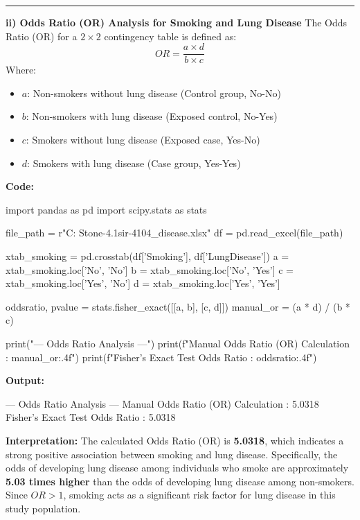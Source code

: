 \documentclass[12pt,a4paper]{article}
\begin{document}
\vspace{0.5cm}
\hrule
\vspace{0.5cm}

\textbf{ii) Odds Ratio (OR) Analysis for Smoking and Lung Disease}
The Odds Ratio (OR) for a $2 \times 2$ contingency table is defined as:
$$OR = \frac{a \times d}{b \times c}$$
Where:
\begin{itemize}
\item $a$: Non-smokers without lung disease 
(Control group, No-No)
\item $b$: Non-smokers with lung disease 
(Exposed control, No-Yes)
\item $c$: Smokers without lung disease 
(Exposed case, Yes-No)
\item $d$: Smokers with lung disease 
(Case group, Yes-Yes)
\end{itemize}

\vspace{0.3cm}
\textbf{Code:}
\begin{codebox}
import pandas as pd
import scipy.stats as stats

file_path = r"C:\Users\hp\OneDrive\Desktop
\Reality Stone-4.1\Siddik sir-4104\lung_disease.xlsx"
df = pd.read_excel(file_path)

xtab_smoking = pd.crosstab(df['Smoking'], df['LungDisease'])
a = xtab_smoking.loc['No', 'No']
b = xtab_smoking.loc['No', 'Yes']
c = xtab_smoking.loc['Yes', 'No']
d = xtab_smoking.loc['Yes', 'Yes']

oddsratio, pvalue = stats.fisher_exact([[a, b], [c, d]])
manual_or = (a * d) / (b * c)

print("--- Odds Ratio Analysis ---")
print(f"Manual Odds Ratio (OR) Calculation : {manual_or:.4f}")
print(f"Fisher's Exact Test Odds Ratio : {oddsratio:.4f}")
\end{codebox}

\textbf{Output:}
\begin{codebox}
--- Odds Ratio Analysis ---
Manual Odds Ratio (OR) Calculation : 5.0318
Fisher's Exact Test Odds Ratio : 5.0318
\end{codebox}

\vspace{0.3cm}
\textbf{Interpretation:}
The calculated Odds Ratio (OR) is \textbf{5.0318}, which indicates a strong positive association between smoking and lung disease.
Specifically, the odds of developing lung disease among individuals who smoke are approximately \textbf{5.03 times higher} than the odds of developing lung disease among non-smokers.
Since $OR > 1$, smoking acts as a significant risk factor for lung disease in this study population.
\end{document}
